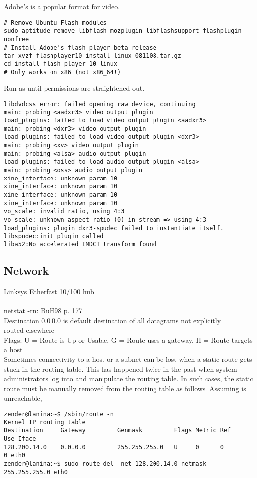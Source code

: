 \documentclass[12pt,twoside]{article}
\begin{document}
Adobe's  is a popular format for video.
\begin{verbatim}
# Remove Ubuntu Flash modules
sudo aptitude remove libflash-mozplugin libflashsupport flashplugin-nonfree
# Install Adobe's flash player beta release
tar xvzf flashplayer10_install_linux_081108.tar.gz
cd install_flash_player_10_linux
# Only works on x86 (not x86_64!)
\end{verbatim}

Run  as  until permissions are straightened out.  
\begin{verbatim}
libdvdcss error: failed opening raw device, continuing
main: probing <aadxr3> video output plugin
load_plugins: failed to load video output plugin <aadxr3>
main: probing <dxr3> video output plugin
load_plugins: failed to load video output plugin <dxr3>
main: probing <xv> video output plugin
main: probing <alsa> audio output plugin
load_plugins: failed to load audio output plugin <alsa>
main: probing <oss> audio output plugin
xine_interface: unknown param 10
xine_interface: unknown param 10
xine_interface: unknown param 10
xine_interface: unknown param 10
vo_scale: invalid ratio, using 4:3
vo_scale: unknown aspect ratio (0) in stream => using 4:3
load_plugins: plugin dxr3-spudec failed to instantiate itself.
libspudec:init_plugin called
liba52:No accelerated IMDCT transform found
\end{verbatim}

\subsection{Network}\label{sxn:ntw2}
Linksys Etherfast 10/100 hub\\
\\
netstat -rn: BuH98 p. 177\\
Destination 0.0.0.0 is default destination of all datagrams not explicitly\\
routed elsewhere\\
Flags: U = Route is Up or Usable, G = Route uses a gateway, H = Route targets a host\\

Sometimes connectivity to a host or a subnet can be lost when a static
route gets stuck in the routing table.
This has happened twice in the past when system administrators log
into  and manipulate the routing table.
In such cases, the static route must be manually removed from the
routing table as follows.
Assuming  is unreachable,
\begin{verbatim}
zender@lanina:~$ /sbin/route -n
Kernel IP routing table
Destination     Gateway         Genmask         Flags Metric Ref    Use Iface
128.200.14.0    0.0.0.0         255.255.255.0   U     0      0        0 eth0
zender@lanina:~$ sudo route del -net 128.200.14.0 netmask 255.255.255.0 eth0
\end{verbatim}
\end{document}
